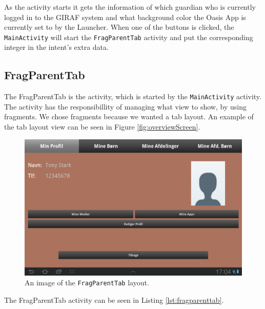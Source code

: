 As the activity starts it gets the information of which guardian who is currently logged in to the GIRAF system and what background color the Oasis App is currently set to by the Launcher.
When one of the buttons is clicked, the \texttt{MainActivity} will start the \texttt{FragParentTab} activity and put the corresponding integer in the intent's extra data.

\subsection{FragParentTab}
The FragParentTab is the activity, which is started by the \texttt{MainActivity} activity.
The activity has the responsibillity of managing what view to show, by using fragments.
We chose fragments because we wanted a tab layout.
An example of the tab layout view can be seen in Figure \vref{fig:overviewScreen}.

\begin{figure}[H]
	\centering
		\includegraphics[width=\textwidth]{Images/overviewScreen}
	\caption{An image of the \texttt{FragParentTab} layout.}
	\label{fig:overviewScreen}
\end{figure}

The FragParentTab activity can be seen in Listing \vref{lst:fragparenttab}.

